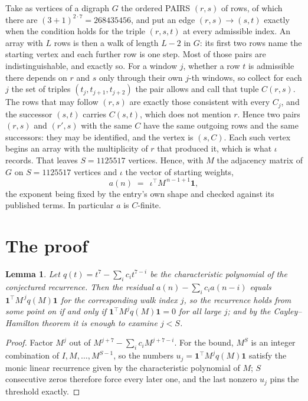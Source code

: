 \documentclass[11pt,a4paper]{article}
\theoremstyle{plain}
\newtheorem{lemma}[theorem]{Lemma}
\theoremstyle{definition}
\begin{document}
Take as vertices of a digraph $G$ the ordered PAIRS $(r,s)$ of rows, of which there are
$(3+1)^{2\cdot7}=268435456$, and put an edge $(r,s)\to(s,t)$ exactly when the condition
holds for the triple $(r,s,t)$ at every admissible index. An array with $L$ rows is then a
walk of length $L-2$ in $G$: its first two rows name the starting vertex and each further
row is one step. Most of those pairs are indistinguishable, and exactly so. For a window $j$, whether a row $t$ is admissible there depends on $r$ and $s$ only through their own $j$-th windows, so collect for each $j$ the set of triples $(t_j,t_{j+1},t_{j+2})$ the pair allows and call that tuple $C(r,s)$. The rows that may follow $(r,s)$ are exactly those consistent with every $C_j$, and the successor $(s,t)$ carries $C(s,t)$, which does not mention $r$. Hence two pairs $(r,s)$ and $(r',s)$ with the same $C$ have the same outgoing rows and the same successors: they may be identified, and the vertex is $(s,C)$. Each such vertex begins an array with the multiplicity of $r$ that produced it, which is what $\iota$ records. That leaves $S=1125517$ vertices. Hence, with $M$ the adjacency matrix of $G$ on $S=1125517$ vertices and
$\iota$ the vector of starting weights,
\[
a(n)\;=\;\,\iota^{\!\top}M^{\,n-1+1}\mathbf{1},
\]
the exponent being fixed by the entry's own shape and checked against its published terms.
In particular $a$ is $C$-finite.

\section{The proof}

\begin{lemma}\label{lem:crit}
Let $q(t)=t^{7}-\sum_i c_it^{7-i}$ be the characteristic polynomial of the
conjectured recurrence. Then the residual $a(n)-\sum_ic_ia(n-i)$ equals
$\mathbf{1}^{\!\top}M^{\,j}q(M)\mathbf{1}$ for the corresponding walk index
$j$, so the recurrence holds from some point on if and only if
$\mathbf{1}^{\!\top}M^{j}q(M)\mathbf{1}=0$ for all large $j$; and by the
Cayley--Hamilton theorem it is enough to examine $j<S$.
\end{lemma}

\begin{proof}
Factor $M^{j}$ out of $M^{j+7}-\sum_ic_iM^{j+7-i}$. For the bound, $M^{S}$
is an integer combination of $I,M,\dots,M^{S-1}$, so the numbers
$u_j=\mathbf{1}^{\!\top}M^{j}q(M)\mathbf{1}$ satisfy the monic linear recurrence given by
the characteristic polynomial of $M$; $S$ consecutive zeros therefore force every later one,
and the last nonzero $u_j$ pins the threshold exactly.
\end{proof}
\end{document}
